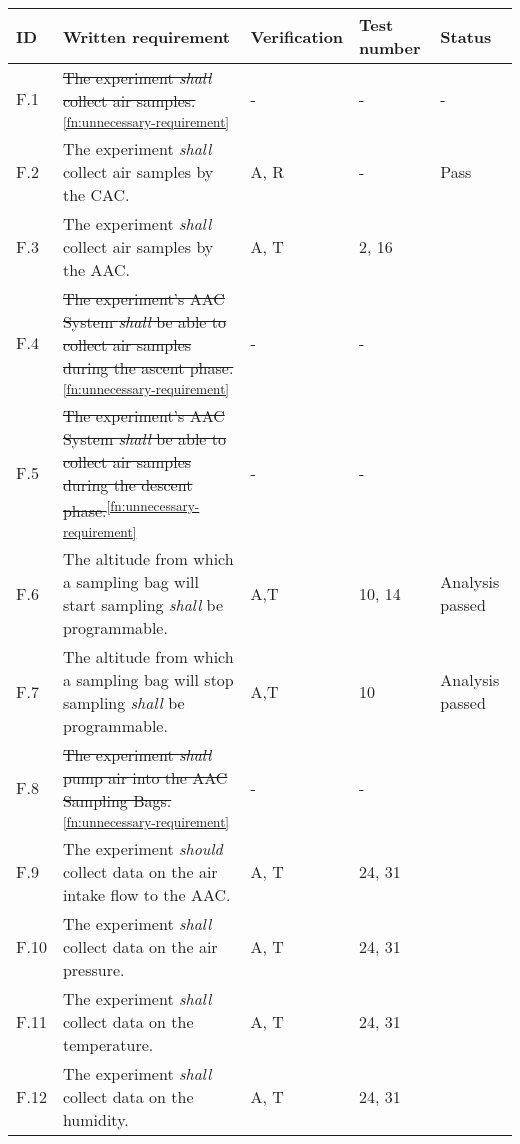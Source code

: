 \makeatletter
\renewcommand\@makefntext[1]{\leftskip=3em\hskip-1em\@makefnmark#1}
\makeatother

\begin{longtable}[]{|m{}| m{} |m{} |m{}|m{}|}

\hline
ID   & Written requirement                                                                                                                                                     & Verification & Test number & Status \\ \hline
F.1  & \st{The experiment \textit{shall} collect air samples.}\textsuperscript{\ref{fn:unnecessary-requirement}}     &- &- &- \\ \hline
F.2  & The experiment \textit{shall} collect air samples by the CAC.&  A, R & - & Pass \\ \hline
F.3  & The experiment \textit{shall} collect air samples by the AAC. & A, T& 2, 16 & \\ \hline
F.4  & \st{The experiment's AAC System \textit{shall} be able to collect air samples during the ascent phase.}\textsuperscript{\ref{fn:unnecessary-requirement}} & - & -& \\ \hline
F.5  & \st{The experiment's AAC System \textit{shall} be able to collect air samples during the descent phase.}\textsuperscript{\ref{fn:unnecessary-requirement}} & - & - & \\ \hline
F.6  & The altitude from which a sampling bag will start sampling \textit{shall} be programmable. & A,T&  10, 14  & Analysis passed\\ \hline
F.7  & The altitude from which a sampling bag will stop sampling \textit{shall} be programmable.& A,T & 10  & Analysis passed\\ \hline
F.8  &\st{The experiment \textit{shall} pump air into the AAC Sampling Bags.}\textsuperscript{\ref{fn:unnecessary-requirement}}  & - & -&\\ \hline
F.9  & The experiment \textit{should} collect data on the air intake flow to the AAC. & A, T & 24, 31 & \\ \hline
F.10 & The experiment \textit{shall} collect data on the air pressure. & A, T& 24, 31 & \\ \hline
F.11 & The experiment \textit{shall} collect data on the temperature. &  A, T& 24, 31 & \\ \hline
F.12 & The experiment \textit{shall} collect data on the humidity. & A, T & 24, 31  & \\ \hline

\end{longtable}
